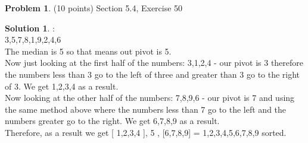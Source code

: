 \documentclass{article}
\theoremstyle{definition}
\newtheorem{problem}{Problem}
\newtheorem*{solution}{Solution}
\begin{document}
\newpage

\begin{problem} (10 points) Section 5.4, Exercise 50
\end{problem}
\begin{solution}:
\\
3,5,7,8,1,9,2,4,6
\\ 
The median is 5 so that means out pivot is 5.
\\

Now just looking at the first half of the numbers: 3,1,2,4 - our pivot is 3 therefore the numbers less than 3 go to the left of three and greater than 3 go to the right of 3. We get 1,2,3,4 as a result.
\\

Now looking at the other half of the numbers: 7,8,9,6 - our pivot is 7 and using the same method above where the numbers less than 7 go to the left and the numbers greater go to the right. We get 6,7,8,9 as a result.
\\

Therefore, as a result we get [ 1,2,3,4 ], 5 , [6,7,8,9] = 1,2,3,4,5,6,7,8,9 sorted.
\end{solution}

\newpage
\end{document}
